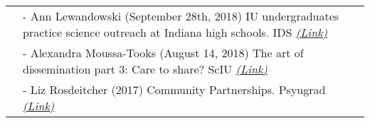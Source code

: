 \documentclass[11pt]{cooperCV_v1/cooperCV} %
\begin{document}
\begin{minipage}{\textwidth}
\begin{tabular}{ @{} p{} p{} @{} }
  \small \textcolor{gray}{{\emph{ }}} & 
  - {\small Ann Lewandowski (September 28th, 2018) IU undergraduates practice science outreach at Indiana high schools. IDS } \footnotesize \textcolor{gray}{\href{https://www.idsnews.com/article/2018/09/iu-undergraduates-practice-science-outreach-at-indiana-high-schools}{\emph{(Link)}}} \\
  
  \small \textcolor{gray}{{\emph{ }}} & 
  - {\small Alexandra Moussa-Tooks (August 14, 2018) The art of dissemination part 3: Care to share? ScIU } \footnotesize \textcolor{gray}{\href{http://blogs.iu.edu/sciu/2018/08/14/dissemination-care-to-share/}{\emph{(Link)}}} \\
  
  \small \textcolor{gray}{{\emph{ }}} & 
  - {\small Liz Rosdeitcher (2017) Community Partnerships. Psyugrad } \footnotesize \textcolor{gray}{\href{https://pbsugrad.indiana.edu/psych4u/community-partnerships/index.html}{\emph{(Link)}}} \\
  
\end{tabular}



\end{minipage}





%


\selectfont
\end{document}
